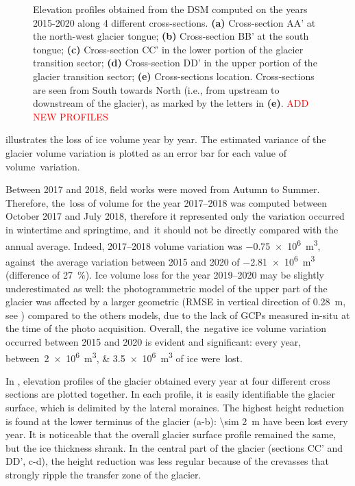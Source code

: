 \begin{figure}[ht!]
{  }
    \caption{Elevation profiles obtained from the DSM computed on the years 2015-2020 along 4 different cross-sections. \textbf{(a)} Cross-section AA' at the north-west glacier tongue; \textbf{(b)} Cross-section BB' at the south tongue; \textbf{(c)} Cross-section CC' in the lower portion of the glacier transition sector; \textbf{(d)} Cross-section DD' in the upper portion of the glacier transition sector; \textbf{(e)} Cross-sections location. Cross-sections are seen from South towards North (i.e., from upstream to downstream of the glacier), as marked by the letters in \textbf{(e)}. \textcolor{red}{ADD NEW PROFILES}}
    \label{fig:3:profiles}
\end{figure}

 illustrates the loss of ice volume year by year.
The estimated variance of the glacier volume variation is plotted as an error bar for
each value of volume~variation.

Between 2017 and 2018, field works were moved from Autumn to Summer.
Therefore, the~loss of volume for the year 2017--2018 was computed between October 2017
and July 2018, therefore it represented only the variation occurred in wintertime and
springtime, and~it should not be directly compared with the annual average.
Indeed, 2017--2018 volume variation was \SI{-0.75e6}{\cubic\meter}, against~the average
variation between 2015 and 2020 of \SI{-2.81e6}{\cubic\meter} (difference of
\SI{27}{\percent}).
Ice volume loss for the year 2019--2020 may be slightly underestimated as well: the
photogrammetric model of the upper part of the glacier was affected by a larger geometric
(RMSE in vertical direction of \SI{0.28}{\meter}, see )
compared to the others models, due to the lack of GCPs measured in-situ at the time of
the photo acquisition.
Overall, the~negative ice volume variation occurred between 2015 and 2020 is evident and
significant: every year, between~\SIlist{2e6;3.5e6}{\cubic\meter} of ice were~lost.

In , elevation profiles of the glacier obtained every year at four different cross sections are plotted together.
In each profile, it is easily identifiable the glacier surface, which is delimited by the lateral moraines.
The highest height reduction is found at the lower terminus of the glacier (a-b): \qty{\sim 2}{\meter} have been lost every year. 
It is noticeable that the overall glacier surface profile remained the same, but the ice thickness shrank.
In the central part of the glacier (sections CC' and DD', c-d), the height reduction was less regular because of the crevasses that strongly ripple the transfer zone of the glacier.	

